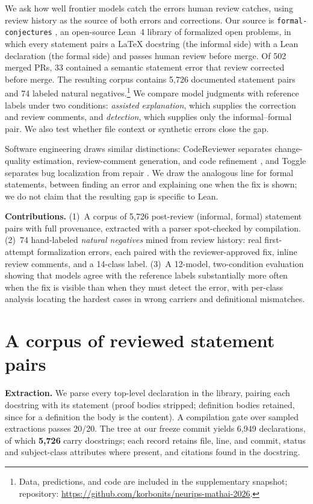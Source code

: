 \documentclass{article}
\begin{document}
We ask how well frontier models catch the errors human review catches, using
review history as the source of both errors and corrections. Our source is
\texttt{formal-conjectures}
\citep{firsching2026formalconjectures,formalconjectures2025}, an open-source
Lean~4 \citep{moura2021lean} library of formalized open problems, in which
every statement pairs a \LaTeX{} docstring (the informal side) with a Lean
declaration (the formal side) and passes human review before merge. Of 502
merged PRs, 33 contained a semantic statement error that review corrected
before merge. The resulting corpus contains
5{,}726 documented statement pairs and 74 labeled natural negatives.\footnote{Data,
predictions, and code are included in the supplementary snapshot; repository:
\url{https://github.com/korbonits/neurips-mathai-2026}.}
We compare model judgments with reference labels under two conditions:
\emph{assisted explanation}, which supplies the correction and review
comments, and \emph{detection}, which supplies only the informal--formal pair.
We also test whether file context or synthetic errors close the gap.

Software engineering draws similar distinctions: CodeReviewer separates
change-quality estimation, review-comment generation, and code refinement
\citep{li2022codereviewer}, and Toggle separates bug localization from repair
\citep{hossain2024toggle}. We draw the analogous line for formal statements,
between finding an error and explaining one when the fix is shown; we do not
claim that the resulting gap is specific to Lean.

\textbf{Contributions.} (1)~A corpus of 5{,}726 post-review (informal,
formal) statement pairs with full provenance, extracted with a parser
spot-checked by compilation. (2)~74 hand-labeled \emph{natural negatives}
mined from review history: real first-attempt formalization errors, each
paired with the reviewer-approved fix, inline review comments, and a 14-class
label. (3)~A 12-model, two-condition evaluation showing that
models agree with the reference labels substantially more often when the fix
is visible than when they must detect the error, with per-class analysis
locating the hardest cases in wrong carriers and definitional mismatches.

\section{A corpus of reviewed statement pairs}
\label{sec:corpus}
\textbf{Extraction.} We parse every top-level declaration in the library,
pairing each docstring with its statement (proof bodies stripped; definition
bodies retained, since for a definition the body is the content). A
compilation gate over sampled extractions passes 20/20. The tree at our
freeze commit yields 6{,}949 declarations, of which \textbf{5{,}726} carry
docstrings; each record retains file, line, and commit, status and
subject-class attributes where present, and citations found in the docstring.
\end{document}
